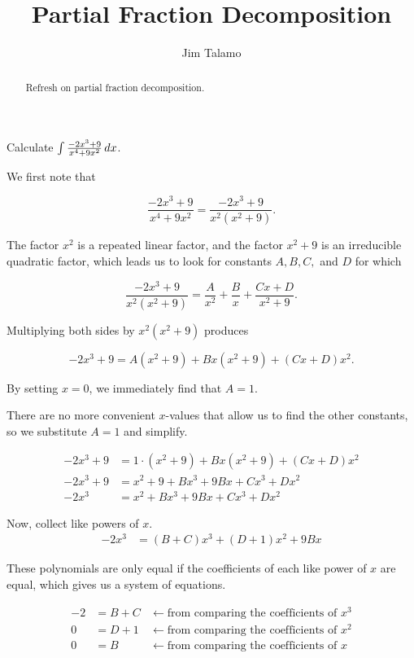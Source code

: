 \documentclass{ximera}
\title[Refresh:]{Partial Fraction Decomposition}
\author{Jim Talamo}
\begin{document}
\begin{abstract}
 Refresh on partial fraction decomposition.
\end{abstract}

\begin{example}
Calculate $\int \frac{-2x^3+9}{x^4+9x^2} \,d x$.  

\begin{explanation}
We first note that 

\[
\frac{-2x^3+9}{x^4+9x^2} = \frac{-2x^3+9}{x^2(x^2+9)}.
\] 

The factor $x^2$ is a repeated linear factor, and the factor $x^2+9$ is an irreducible quadratic factor, which leads us to look for constants $A, B, C,$ and $D$ for which 

\[
\frac{-2x^3+9}{x^2(x^2+9)} = \frac{A}{x^2}+\frac{B}{x}+\frac{Cx+D}{x^2+9}.
\]

Multiplying both sides by $x^2(x^2+9)$ produces

\[
-2x^3+9 = A(x^2+9)+Bx(x^2+9)+(Cx+D)x^2.
\]

By setting $x=0$, we immediately find that $A=1$.

There are no more convenient $x$-values that allow us to find the other constants, so we substitute $A=1$ and simplify.

\begin{align*}
-2x^3+9 &= 1\cdot(x^2+9)+Bx(x^2+9)+(Cx+D)x^2 \\
-2x^3+9 &= x^2+9+Bx^3+9Bx+Cx^3+Dx^2 \\
-2x^3 &= x^2+Bx^3+9Bx+Cx^3+Dx^2
\end{align*}

Now, collect like powers of $x$.
\begin{align*}
-2x^3 &= (B+C)x^3 +(D+1)x^2 +9Bx
\end{align*}

These polynomials are only equal if the coefficients of each like power of $x$ are equal, which gives us a system of equations.

\begin{align*}
-2 & = B+C & \longleftarrow \textrm{from comparing the coefficients of } x^3 \\
0 & = D+1 & \longleftarrow  \textrm{from comparing the coefficients of } x^2 \\
0 & = B & \longleftarrow  \textrm{from comparing the coefficients of } x 
\end{align*}


\end{explanation}
\end{example}
\end{document}
